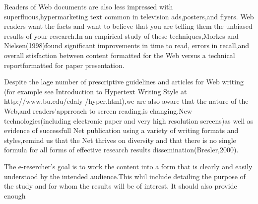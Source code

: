 \documentclass[10pt,a4paper]{article}
\begin{document}
Readers of Web documents are also less impressed with superfluous,hypermarketing text common in television ads,posters,and flyers. Web readers want the facts and want to believe that you are telling them the unbiased results of your research.In an empirical study of these techniques,Morkes and Nielsen(1998)found significant improvements in time to read, errors in recall,and overall stisfaction between content formatted for the Web versus a technical reportformatted for paper presentation.

Despite the lage number of prescriptive guidelines and articles for Web writing (for example see Introduction to Hypertext Writing Style at http://www.bu.edu/cdaly
/hyper.html),we are also aware that the nature of the Web,and readers'apprroach to screen reading,is changing.New technologies(including electronic paper and very high resolution screens)as well as evidence of successfull Net publication using a variety of writing formats and styles,remind us that the Net thrives on diversity and that there is no single formula for all forms of effective research results dissemination(Bresler,2000).

The e-resercher's goal is to work the content into a form that is clearly and easily understood by the intended audience.This whil include detailing the purpose of the study and for whom the results will be of interest. It should also provide enough
\end{document}
